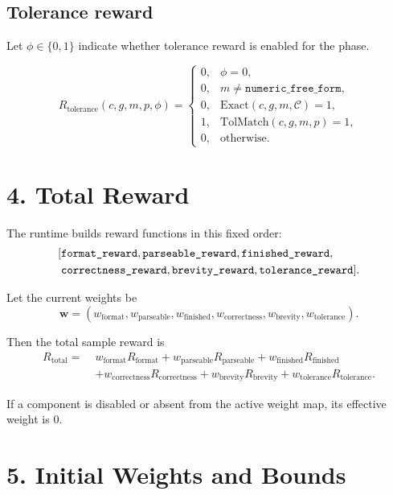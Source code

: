 \documentclass[11pt]{article}
\begin{document}
\subsection*{Tolerance reward}
Let $\phi \in \{0,1\}$ indicate whether tolerance reward is enabled for the phase.

\[
R_{\mathrm{tolerance}}(c,g,m,p,\phi)
=
\begin{cases}
0, & \phi = 0, \\
0, & m \neq \texttt{numeric\_free\_form}, \\
0, & \mathrm{Exact}(c,g,m,\mathcal{C}) = 1, \\
1, & \mathrm{TolMatch}(c,g,m,p) = 1, \\
0, & \text{otherwise.}
\end{cases}
\]

\section*{4. Total Reward}
The runtime builds reward functions in this fixed order:
\[
\begin{aligned}
\relax[
&\texttt{format\_reward},
\texttt{parseable\_reward},
\texttt{finished\_reward}, \\
&\texttt{correctness\_reward},
\texttt{brevity\_reward},
\texttt{tolerance\_reward}
].
\end{aligned}
\]

Let the current weights be
\[
\mathbf{w}
=
\left(
w_{\mathrm{format}},
w_{\mathrm{parseable}},
w_{\mathrm{finished}},
w_{\mathrm{correctness}},
w_{\mathrm{brevity}},
w_{\mathrm{tolerance}}
\right).
\]

Then the total sample reward is
\begin{align*}
R_{\mathrm{total}}
=\;&
w_{\mathrm{format}} R_{\mathrm{format}}
+ w_{\mathrm{parseable}} R_{\mathrm{parseable}}
+ w_{\mathrm{finished}} R_{\mathrm{finished}} \\
&+ w_{\mathrm{correctness}} R_{\mathrm{correctness}}
+ w_{\mathrm{brevity}} R_{\mathrm{brevity}}
+ w_{\mathrm{tolerance}} R_{\mathrm{tolerance}}.
\end{align*}

If a component is disabled or absent from the active weight map, its effective weight is $0$.

\section*{5. Initial Weights and Bounds}
\end{document}
